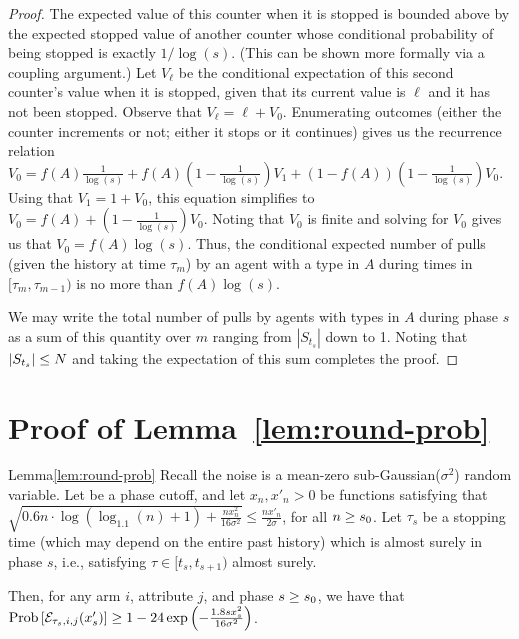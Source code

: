 \begin{proof}
The expected value of this counter when it is stopped is bounded above
by the expected stopped value of another counter whose conditional
probability of being stopped is exactly $1/\log(s)$.
(This can be shown more formally via a coupling argument.) 
Let $V_\ell$ be the conditional expectation of this second counter's value when it is stopped,
given that its current value is $\ell$ and it has not been stopped.
Observe that $V_\ell = \ell + V_0$.
Enumerating outcomes
(either the counter increments or not; either it stops or it continues)
gives us the recurrence relation
$V_0 = f(A) \frac{1}{\log(s)} + f(A) (1-\frac{1}{\log(s)}) V_1
   + (1-f(A))(1-\frac{1}{\log(s)}) V_0$.
Using that $V_1 = 1 + V_0$, this equation simplifies to 
$V_0 = f(A) + (1-\frac{1}{\log(s)}) V_0$.
Noting that $V_0$ is finite and solving for $V_0$ gives us that
$V_0 = f(A) \log(s)$.
Thus, the conditional expected number of pulls (given the history at time $\tau_m$)
by an agent with a type in $A$ during times in $[\tau_m, \tau_{m-1})$
is no more than $f(A) \log(s)$.

We may write the total number of pulls by agents with types in $A$
during phase $s$ as a sum of this quantity over $m$ ranging from
$|S_{t_s}|$ down to 1.
Noting that $|S_{t_s}| \leq N$ and taking the expectation of
this sum completes the proof. 
\end{proof}







\section{Proof of Lemma~\ref{lem:round-prob}}
\label{sec:lemma5-proof}

\begin{rlemma}{Lemma}{\ref{lem:round-prob}}
Recall the noise is a mean-zero sub-Gaussian($\sigma^2$) random variable.
Let \LatePhase be a phase cutoff, 
and let $x_n, x'_n > 0$ be functions satisfying that
$\sqrt{0.6 n \cdot \log (\log_{1.1}(n) + 1) + \frac{n x_n^2}{16 \sigma^2}}
\leq \frac{n x'_n}{2 \sigma}$,
for all $n \geq s_0$.
Let $\tau_s$ be a stopping time
(which may depend on the entire past history)
which is almost surely in phase $s$,
i.e., satisfying $\tau \in [t_s, t_{s+1})$ almost surely.

Then, for any arm $i$, attribute $j$, and phase $s \geq s_0$,
we have that
$\Prob{\AccE{\tau_s}{i}{j}{x'_s}}
\geq 1 - 24 \exp\left(-\frac{1.8 s x_s^2}{16 \sigma^2} \right)$.
\end{rlemma}

